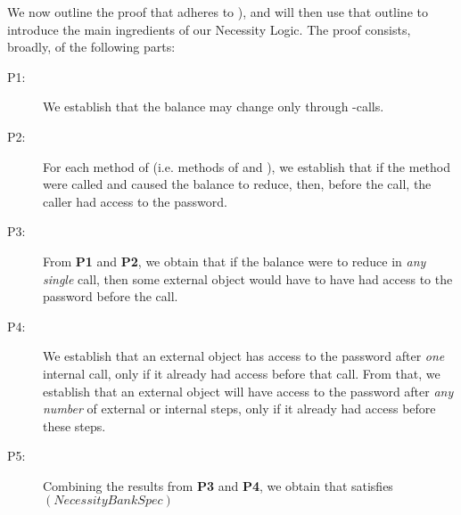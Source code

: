 
We  now outline the proof that  adheres to ),
and  will then use that outline to 
 introduce the main ingredients of our Necessity Logic. The proof consists,
broadly, of the following parts:


\begin{description}
\item[P1:] We establish that the balance 
 may change only   through -\internalC calls.  

\item[P2:] 
For each method of  (i.e. methods of  and ),  we establish that   
if the method were called and  caused the  balance to reduce, then, before the call,
the caller had access  to the password.

\item[P3:]  
From \textbf{P1} and \textbf{P2}, we obtain that if the balance were to 
reduce in \emph{any}  \emph{single} call, then some
external object would have to have had access to the password before the call.

\item[P4:] We establish %
that   an external object has access to 
the password after \emph{one} internal call, only if it already had access before that call.
From that, we establish  that  an external object will have access to 
the password after \emph{any number} of external or internal 
steps, only if it already had access before these steps.

\item[P5:] Combining  the results from \textbf{P3} and \textbf{P4}, we obtain
that   satisfies $(NecessityBankSpec)$

\end{description} 
 

